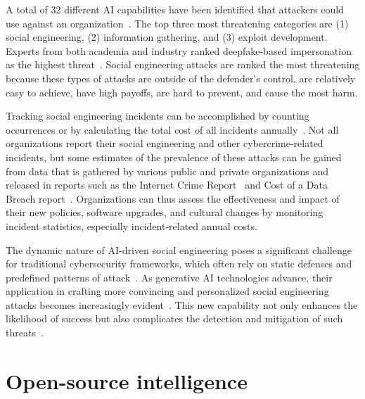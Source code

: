 %
%
A total of 32 different AI capabilities have been identified that attackers could use against an organization~\citep{mirsky_Threat_Offensive_AI_Organizations_2023}. The top three most threatening categories are (1) social engineering, (2) information gathering, and (3) exploit development. Experts from both academia and industry ranked deepfake-based impersonation as the highest threat~\citep{mirsky_Threat_Offensive_AI_Organizations_2023}. Social engineering attacks are ranked the most threatening because these types of attacks are outside of the defender's control, are relatively easy to achieve, have high payoffs, are hard to prevent, and cause the most harm.



%
%
Tracking social engineering incidents can be accomplished by counting occurrences or by calculating the total cost of all incidents annually~\citep{ibm_Cost_Data_Breach_Report_2024}. Not all organizations report their social engineering and other cybercrime-related incidents, but some estimates of the prevalence of these attacks can be gained from data that is gathered by various public and private organizations and released in reports such as the Internet Crime Report~\citep{fbi_Internet_Crime_Report_2023} and Cost of a Data Breach report~\citep{ibm_Cost_Data_Breach_Report_2024}. Organizations can thus assess the effectiveness and impact of their new policies, software upgrades, and cultural changes by monitoring incident statistics, especially incident-related annual costs.




%
%
The dynamic nature of AI-driven social engineering poses a significant challenge for traditional cybersecurity frameworks, which often rely on static defenses and predefined patterns of attack~\citep{fakhouri_AI_Driven_Solutions_SE_Attacks_2024}. As generative AI technologies advance, their application in crafting more convincing and personalized social engineering attacks becomes increasingly evident~\citep{blauth_AI_Crime_Overview_Malicious_Use_Abuse_2022}. This new capability not only enhances the likelihood of success but also complicates the detection and mitigation of such threats~\citep{mirsky_Threat_Offensive_AI_Organizations_2023}.











\section{Open-source intelligence}
\begin{comment}
Some case studies highlighting the use of OSINT in real-world social engineering incidents?
\end{comment}

